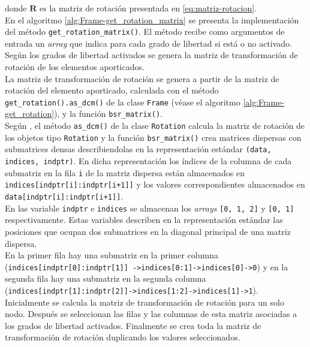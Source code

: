 donde $ \mathbf{R} $ es la matriz de rotación presentada en \eqref{eq:matriz-rotacion}.\\

En el algoritmo \ref{alg:Frame-get_rotation_matrix} se presenta la implementación del método \verb|get_rotation_matrix()|. El método recibe como argumentos de entrada un \emph{array} que indica para cada grado de libertad si está o no activado. Según los grados de libertad activados se genera la matriz de transformación de rotación de los elementos aporticados.\\

La matriz de transformación de rotación se genera a partir de la matriz de rotación del elemento aporticado, calculada con el método \verb|get_rotation().as_dcm()| de la clase \verb|Frame| (véase el algoritmo \ref{alg:Frame-get_rotation}), y la función \verb|bsr_matrix()|.\\

Según \cite{2020SciPy-NMeth}, el método \verb|as_dcm()| de la clase \verb|Rotation| calcula la matriz de rotación de los objetos tipo \verb|Rotation| y la función \verb|bsr_matrix()| crea matrices dispersas con submatrices densas describiendolas en la representación estándar \verb|(data, indices, indptr)|. En dicha representación los índices de la columna de cada submatriz en la fila \verb|i| de la matriz dispersa están almacenados en \verb|indices[indptr[i]:indptr[i+1]]| y los valores correspondientes almacenados en \verb|data[indptr[i]:indptr[i+1]]|.\\

En las variable \verb|indptr| e \verb|indices| se almacenan los \emph{arrays} \verb|[0, 1, 2]| y \verb|[0, 1]| respectivamente. Estas variables describen en la representación estándar las posiciones que ocupan dos submatrices en la diagonal principal de una matriz dispersa.\\

En la primer fila hay una submatriz en la primer columna (\verb|indices[indptr[0]:indptr[1]]|\ \verb|->|\verb|indices[0:1]|\verb|->|\verb|indices[0]->0|) y en la segunda fila hay una submatriz en la segunda columna (\verb|indices[|\verb|indptr[1]:indptr[2]]|\verb|->|\verb|indices[1:2]|\verb|->|\verb|indices[1]->1|).\\

Inicialmente se calcula la matriz de transformación de rotación para un solo nodo. Después se seleccionan las filas y las columnas de esta matriz asociadas a los grados de libertad activados. Finalmente se crea toda la matriz de transformación de rotación duplicando los valores seleccionados.\\

